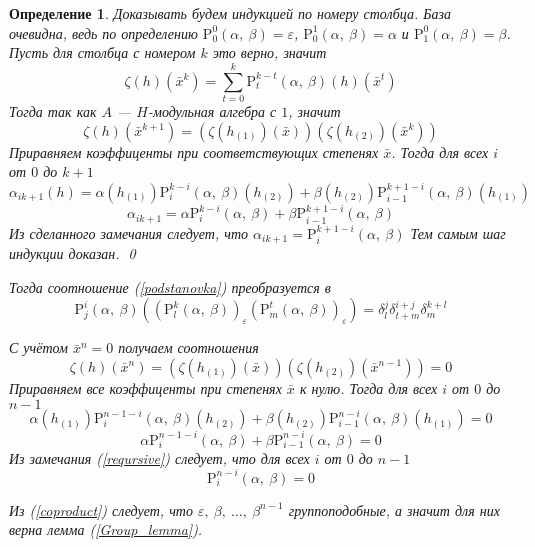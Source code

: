 \documentclass[12pt, reqno, a4paper, oneside, notitlepage]{amsart}
\makeatletter
\theoremstyle{mytheoremstyle}
\theoremstyle{myremarkstyle}
\newtheorem{definition}[theorem]{Определение}
\numberwithin{equation}{section}
\renewenvironment{proof}[1][\proofname]{\par\indent {\bfseries #1\@addpunct{.} }}{\qed}
\makeatother
\begin{document}
\begin{definition}
\begin{proof}
  Доказывать будем индукцией по номеру столбца. 
  База очевидна, ведь по определению $\mathrm{P}^0_0(\alpha,\ \beta) = \varepsilon$, $\mathrm{P}^1_0(\alpha,\ \beta) = \alpha$ и $\mathrm{P}^0_1(\alpha,\ \beta) = \beta$.
  Пусть для столбца с номером $k$ это верно, значит
  \[
	\zeta(h)(\bar x^k) = \sum\limits_{t = 0}^k \mathrm{P}^{k-t}_t(\alpha,\ \beta)(h)(\bar x^t) 
  \]
  Тогда так как $A$ --- $H$-модульная алгебра с $1$, значит
  \[
	\zeta(h)(\bar x^{k+1}) = \left(\zeta(h_{(1)})(\bar x)\right) \left(\zeta(h_{(2)})(\bar x^k)\right)
  \]
  Приравняем коэффиценты при соответствующих степенях $\bar x$. Тогда для всех $i$ от $0$ до $k+1$ 
  \[
	\alpha_{ik+1}(h) = \alpha(h_{(1)})\mathrm{P}^{k-i}_i(\alpha,\ \beta)(h_{(2)})+\beta(h_{(2)})\mathrm{P}^{k+1-i}_{i-1}(\alpha,\ \beta)(h_{(1)})
  \]
  \[
	\alpha_{ik+1} = \alpha\mathrm{P}^{k-i}_i(\alpha,\ \beta)+\beta\mathrm{P}^{k+1-i}_{i-1}(\alpha,\ \beta)
  \]
  Из сделанного замечания следует, что $\alpha_{ik+1} = \mathrm{P}^{k+1-i}_{i}(\alpha,\ \beta)$
  Тем самым шаг индукции доказан.
\end{proof}

Тогда соотношение (\ref{podstanovka}) преобразуется в 
\begin{equation} \label{pods*}
  \mathrm{P}^i_j(\alpha,\ \beta)\left(\left(\mathrm{P}^k_l(\alpha,\ \beta)\right)_\varepsilon\left(\mathrm{P}^t_m(\alpha,\ \beta)\right)_\varepsilon\right) = 
  \delta^j_l\delta^{i+j}_{t+m}\delta^{k+l}_m
\end{equation}

С учётом $\bar x^n = 0$ получаем соотношения
\[
  \zeta(h)(\bar x^n) =  \left(\zeta(h_{(1)})(\bar x)\right) \left(\zeta(h_{(2)})(\bar x^{n-1})\right) = 0
\]
Приравняем все коэффиценты при степенях $\bar x$ к нулю. Тогда для всех $i$ от $0$ до $n-1$ 
\[
  \alpha(h_{(1)})\mathrm{P}^{n-1-i}_i(\alpha,\ \beta)(h_{(2)})+\beta(h_{(2)})\mathrm{P}^{n-i}_{i-1}(\alpha,\ \beta)(h_{(1)}) = 0
\]
\[
  \alpha\mathrm{P}^{n-1-i}_i(\alpha,\ \beta)+\beta\mathrm{P}^{n-i}_{i-1}(\alpha,\ \beta) = 0
\]
Из замечания (\ref{reqursive}) следует, что для всех $i$ от $0$ до $n-1$ 
\begin{equation} \label{null}
  \mathrm{P}^{n-i}_{i}(\alpha,\ \beta) = 0
\end{equation}

Из (\ref{coproduct}) следует, что $\varepsilon,\ \beta,\ \dots,\ \beta^{n-1}$ группоподобные, а значит для них верна лемма (\ref{Group_lemma}).


\end{definition}
\end{document}
